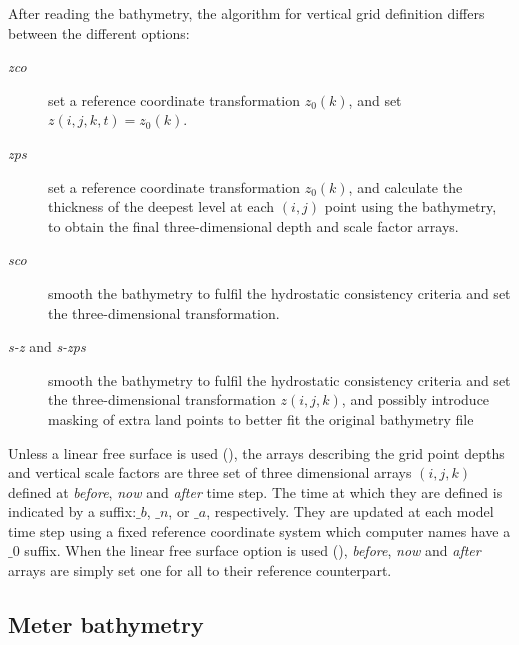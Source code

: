 \documentclass[../tex_main/NEMO_manual]{subfiles}
\begin{document}
After reading the bathymetry, the algorithm for vertical grid definition differs 
between the different options:
\begin{description}
\item[\textit{zco}] set a reference coordinate transformation $z_0 (k)$, and set $z(i,j,k,t)=z_0 (k)$.
\item[\textit{zps}] set a reference coordinate transformation $z_0 (k)$, and 
calculate the thickness of the deepest level at each $(i,j)$ point using the 
bathymetry, to obtain the final three-dimensional depth and scale factor arrays.
\item[\textit{sco}] smooth the bathymetry to fulfil the hydrostatic consistency 
criteria and set the three-dimensional transformation.
\item[\textit{s-z} and \textit{s-zps}] smooth the bathymetry to fulfil the hydrostatic 
consistency criteria and set the three-dimensional transformation $z(i,j,k)$, and 
possibly introduce masking of extra land points to better fit the original bathymetry file
\end{description}

Unless a linear free surface is used (), the arrays describing 
the grid point depths and vertical scale factors are three set of three dimensional arrays $(i,j,k)$ 
defined at \textit{before}, \textit{now} and \textit{after} time step. The time at which they are
defined is indicated by a suffix:$\_b$, $\_n$, or $\_a$, respectively. They are updated at each model time step
using a fixed reference coordinate system which computer names have a $\_0$ suffix. 
When the linear free surface option is used (), \textit{before}, \textit{now} 
and \textit{after} arrays are simply set one for all to their reference counterpart. 


\subsection{Meter bathymetry}
\label{subsec:DOM_bathy}
\end{document}
